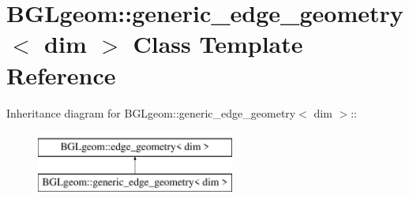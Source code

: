 \hypertarget{classBGLgeom_1_1generic__edge__geometry}{
\section{BGLgeom::generic\_\-edge\_\-geometry$<$ dim $>$ Class Template Reference}
\label{classBGLgeom_1_1generic__edge__geometry}
}
Inheritance diagram for BGLgeom::generic\_\-edge\_\-geometry$<$ dim $>$::\begin{figure}[H]
\begin{center}
\leavevmode
\includegraphics[height=2cm]{classBGLgeom_1_1generic__edge__geometry}
\end{center}
\end{figure}
